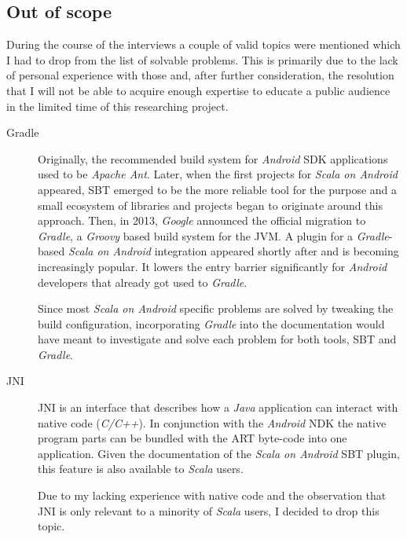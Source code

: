 \subsection{Out of scope}

During the course of the interviews a couple of valid topics were mentioned which I had to drop from the list of solvable problems. This is primarily due to the lack of personal experience with those and, after further consideration, the resolution that I will not be able to acquire enough expertise to educate a public audience in the limited time of this researching project.

\begin{description}

	\item[Gradle]\hfill

	Originally, the recommended build system for \textit{Android} \ac{SDK} applications used to be \textit{Apache Ant}. Later, when the first projects for \textit{Scala on Android} appeared, \ac{SBT} emerged to be the more reliable tool for the purpose and a small ecosystem of libraries and projects began to originate around this approach. Then, in 2013, \textit{Google} announced the official migration to \textit{Gradle}, a \textit{Groovy} based build system for the \ac{JVM}. A plugin for a \textit{Gradle}-based \textit{Scala on Android} integration appeared shortly after and is becoming increasingly popular. It lowers the entry barrier significantly for \textit{Android} developers that already got used to \textit{Gradle}.

	Since most \textit{Scala on Android} specific problems are solved by tweaking the build configuration, incorporating \textit{Gradle} into the documentation would have meant to investigate and solve each problem for both tools, \ac{SBT} and \textit{Gradle}.

	\item[JNI]\hfill

	\ac{JNI} is an interface that describes how a \textit{Java} application can interact with native code (\textit{C/C++}). In conjunction with the \textit{Android} \ac{NDK} the native program parts can be bundled with the \ac{ART} byte-code into one application. Given the documentation of the \textit{Scala on Android} \ac{SBT} plugin, this feature is also available to \textit{Scala} users.

	Due to my lacking experience with native code and the observation that \ac{JNI} is only relevant to a minority of \textit{Scala} users, I decided to drop this topic.

\end{description}